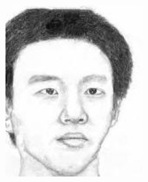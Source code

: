 \documentclass[10pt,twocolumn,letterpaper]{article}
\begin{document}
\begin{figure}[htbp]
{\begin{minipage}[b]{0.22\linewidth}
\includegraphics[width=0.99\linewidth]{img/light&pose_invariance/mrfe_p2.jpg}
\end{minipage}
}
\end{figure}
\end{document}
